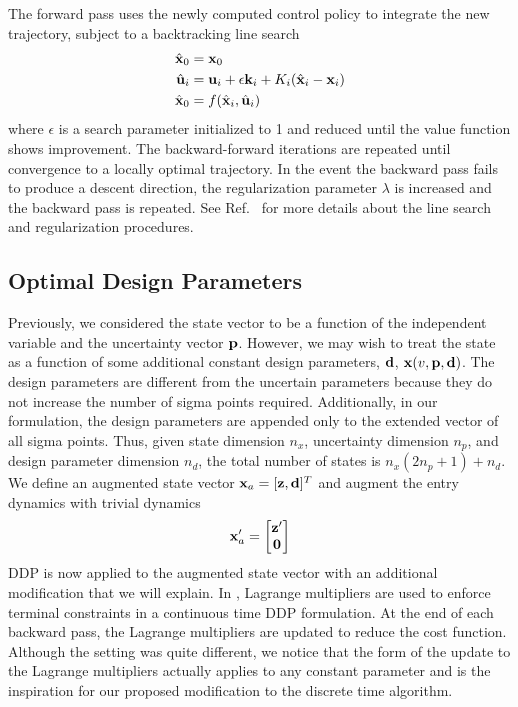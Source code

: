 The forward pass uses the newly computed control policy to integrate the new trajectory, subject to a backtracking line search
\begin{align}
	\hat{\mathbf{x}}_0 &= \mathbf{x}_0 \\
	\hat{\mathbf{u}}_{i} &= \mathbf{u}_i + \epsilon \mathbf{k}_i + K_i(\hat{\mathbf{x}}_i - \mathbf{x}_i)\\
	\hat{\mathbf{x}}_0 &= f(\hat{\mathbf{x}}_i,\hat{\mathbf{u}}_i)
\end{align}
where $\epsilon$ is a search parameter initialized to 1 and reduced until the value function shows improvement. The backward-forward iterations are repeated until convergence to a locally optimal trajectory. In the event the backward pass fails to produce a descent direction, the regularization parameter $\lambda$ is increased and the backward pass is repeated. See Ref.~\cite{DDP_ControlLimited} for more details about the line search and regularization procedures. 

\subsection{Optimal Design Parameters}\label{Sec:DesignOptimization}
Previously, we considered the state vector to be a function of the independent variable and the uncertainty vector $\mathbf{p}$. However, we may wish to treat the state as a function of some additional constant design parameters, $\mathbf{d}$, $\mathbf{x}(v, \mathbf{p}, \mathbf{d})$. The design parameters are different from the uncertain parameters because they do not increase the number of sigma points required. Additionally, in our formulation, the design parameters are appended only to the extended vector of all sigma points. Thus, given state dimension $n_x$, uncertainty dimension $n_p$, and design parameter dimension $n_d$, the total number of states is $n_x(2n_p+1) + n_d$. We define an augmented state vector $\mathbf{x}_a = [\mathbf{z}, \mathbf{d}]^T$ 
and augment the entry dynamics with trivial dynamics
\begin{align}
	\mathbf{x}_a' = \left[
	\begin{matrix}
		\mathbf{z}' \\
		\mathbf{0}
	\end{matrix}
	\right]
\end{align}
DDP is now applied to the augmented state vector with an additional modification that we will explain. In \cite{DDP:ContinuousTerminalConstraints}, Lagrange multipliers are used to enforce terminal constraints in a continuous time DDP formulation. At the end of each backward pass, the Lagrange multipliers are updated to reduce the cost function. Although the setting was quite different, we notice that the form of the update to the Lagrange multipliers actually applies to any constant parameter and is the inspiration for our proposed modification to the discrete time algorithm.

